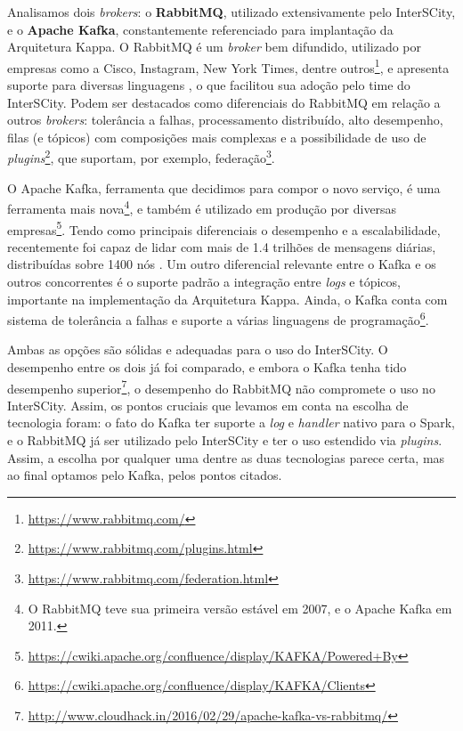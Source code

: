 Analisamos dois \textit{brokers}: o \textbf{RabbitMQ}, utilizado
extensivamente pelo InterSCity, e o \textbf{Apache Kafka}, constantemente
referenciado para implantação da Arquitetura Kappa. O RabbitMQ é um
\textit{broker} bem difundido, utilizado por empresas como a Cisco, Instagram,
New York Times, dentre outros\footnote{\url{https://www.rabbitmq.com/}},
e apresenta suporte para diversas linguagens \cite{zaitsev2014}, o que
facilitou sua adoção pelo time do InterSCity. Podem ser destacados como
diferenciais do RabbitMQ em relação a outros \textit{brokers}: tolerância a
falhas, processamento distribuído, alto desempenho, filas (e tópicos) com
composições mais complexas e a possibilidade de uso de
\textit{plugins}\footnote{\url{https://www.rabbitmq.com/plugins.html}},
que suportam, por exemplo,
federação\footnote{\url{https://www.rabbitmq.com/federation.html}}.

O Apache Kafka, ferramenta que decidimos para compor o novo serviço,
é uma ferramenta mais nova\footnote{O RabbitMQ teve
sua primeira versão estável em 2007, e o Apache Kafka em 2011.}, e também é
utilizado em produção por diversas
empresas\footnote{\url{https://cwiki.apache.org/confluence/display/KAFKA/Powered+By}}.
Tendo como principais diferenciais o desempenho e a escalabilidade,
recentemente foi capaz de lidar com mais de 1.4 trilhões de mensagens diárias,
distribuídas sobre 1400 nós \cite{koshy2016}. Um outro diferencial relevante
entre o Kafka e os outros concorrentes é o suporte padrão a integração entre
\textit{logs} e tópicos, importante na implementação da Arquitetura Kappa. Ainda,
o Kafka conta com sistema de tolerância a falhas e suporte a várias linguagens de
programação\footnote{\url{https://cwiki.apache.org/confluence/display/KAFKA/Clients}}.

Ambas as opções são sólidas e adequadas para o uso do InterSCity. O
desempenho entre os dois já foi comparado, e embora o Kafka tenha tido desempenho
superior\footnote{\url{http://www.cloudhack.in/2016/02/29/apache-kafka-vs-rabbitmq/}},
o desempenho do RabbitMQ não compromete o uso no InterSCity. Assim, os pontos
cruciais que levamos em conta na escolha de tecnologia foram: o fato do Kafka
ter suporte a \textit{log} e \textit{handler} nativo para o Spark, e o RabbitMQ
já ser utilizado pelo InterSCity e ter o uso estendido via \textit{plugins}.
Assim, a escolha por qualquer uma dentre as duas tecnologias parece certa, mas
ao final optamos pelo Kafka, pelos pontos citados.
